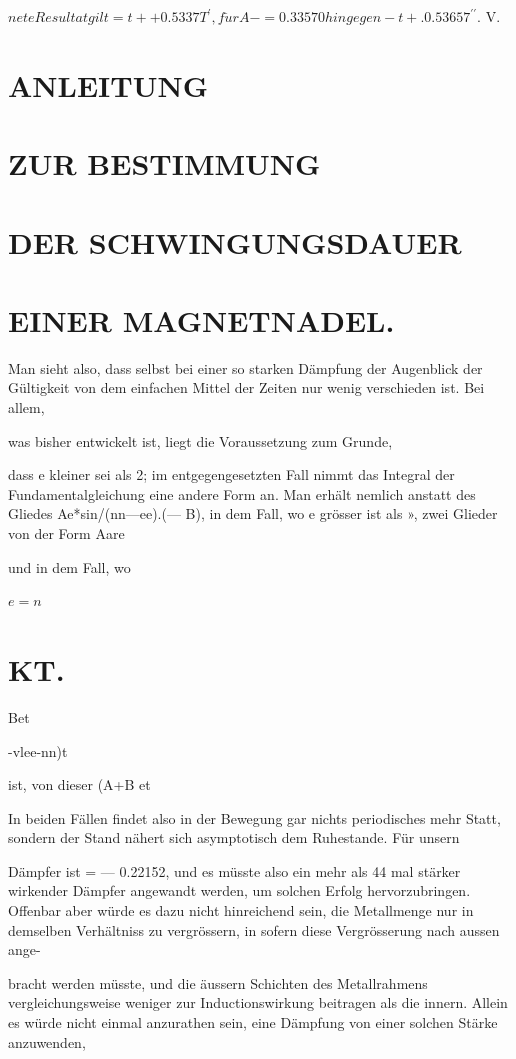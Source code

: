 \documentclass[12pt,a4paper]{article}
\begin{document}
$nete Resultat gilt = t++ 0.5337 T^{\prime}, f\ddot{u}r A -= 0.33570 hingegen - t+.0.5365 7^{\prime\prime}.$ V.

\section*{ANLEITUNG}
\section*{ZUR BESTIMMUNG}
\section*{DER SCHWINGUNGSDAUER}
\section*{EINER MAGNETNADEL.}
Man sieht also, dass selbst bei einer so starken Dämpfung der Augenblick der Gültigkeit von dem einfachen Mittel der Zeiten nur wenig verschieden ist. Bei allem,

was bisher entwickelt ist, liegt die Voraussetzung zum Grunde,

dass e kleiner sei als 2; im entgegengesetzten Fall nimmt das Integral der Fundamentalgleichung eine andere Form an. Man erhält nemlich anstatt des Gliedes Ae*sin/(nn—ee).(— B), in dem Fall, wo e grösser ist als », zwei Glieder von der Form Aare

und in dem Fall, wo

$e=n$

\section*{KT.}
Bet

-vlee-nn)t

ist, von dieser (A+B et

In beiden Fällen findet also in der Bewegung gar nichts periodisches mehr Statt, sondern der Stand nähert sich asymptotisch dem Ruhestande. Für unsern

Dämpfer ist = — 0.22152, und es müsste also ein mehr als 44 mal stärker wirkender Dämpfer angewandt werden, um solchen Erfolg hervorzubringen. Offenbar aber würde es dazu nicht hinreichend sein, die Metallmenge nur in demselben Verhältniss zu vergrössern, in sofern diese Vergrösserung nach aussen ange-

bracht werden müsste, und die äussern Schichten des Metallrahmens vergleichungsweise weniger zur Inductionswirkung beitragen als die innern. Allein es würde nicht einmal anzurathen sein, eine Dämpfung von einer solchen Stärke anzuwenden,
\end{document}
